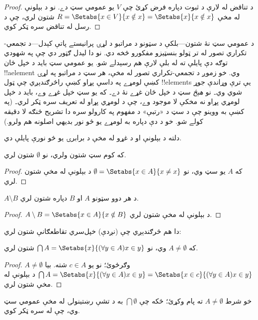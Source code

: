 \documentclass[../../../include/open-logic-section]{subfiles}
\begin{document}
\begin{proof}
د تناقض له لارې د ثبوت دپاره فرض کړئ چې $V$ يو عمومي سټ دے.
نو د بېلونې له مخې $R =
\Setabs{x \in V}{x \notin x} = \Setabs{x}{x \notin x}$ شتون لري،
چې د رسل له تناقض سره ټکر کوي.
\end{proof}

د عمومي سټ نۀ شتون---بلکې د سټونو د مراتبو د لړۍ پرانيستے پاتې
کېدل---د تجمعي-تکراري تصور له تر ټولو بنسټيزو مفکورو څخه دي.
نو دا ليدل ګټور دي چې په شهودي توګه دې پايلې ته له بلې لارې هم
رسېدلے شو. يو عمومي سټ بايد د خپل ځان !!a{element} وي.
خو زموږ د تجمعي-تکراري تصور له مخې، هر سټ د مراتبو په لړۍ کښې
لومړے په داسې پړاو کښې راڅرګندېږي چې ټول !!{element}s يې
ترې وړاندې جوړ شوي وي۔ نو \emph{هېڅ} سټ د خپل ځان غړے نۀ
دے۔ که يو سټ خپل غړے وے، بايد د خپل لومړي پړاو نه مخکې
لا موجود وے، چې د لومړي پړاو له تعريف سره ټکر لري۔
(په  کښې به ووينو چې د سټ
د «رتبې» د مفهوم په کارولو سره دا تشريح څنګه لا دقيقه کولے شو.
خو د دې دپاره به لومړے يو څو نور بديهي اصلونه هم ولرو.)

دلته د بېلونې او د غړو له مخې د برابرۍ يو څو نورې پايلې دي.

\begin{prop}
که کوم سټ شتون ولري، نو $\emptyset$ شتون لري.
\end{prop}

\begin{proof}
که $A$ يو سټ وي، نو $\emptyset = \Setabs{x \in A}{x \neq x}$ د بېلونې له مخې شتون لري.
\end{proof}

\begin{prop}
$A \setminus B$ د هر دوو سټونو $A$ او $B$ دپاره شتون لري.
\end{prop}

\begin{proof}
$A \setminus B = \Setabs{x \in A}{x \notin B}$ د بېلونې له مخې شتون لري.
\end{proof}

دا هم څرګندېږي چې (نږدې) خپل‌سري تقاطعګانې شتون لري:

\begin{prop}
که $A \neq \emptyset$ وي، نو $\bigcap A = \Setabs{x}{(\forall y \in A)x \in y}$ شتون لري.
\end{prop}

\begin{proof}
$A \neq \emptyset$ وګرځوئ؛ نو يو $c \in A$ شته. بيا
$\bigcap A =
\Setabs{x}{(\forall y \in A)x \in y} = \Setabs{x \in c}{(\forall y \in
A)x \in y}$ د بېلونې له مخې شتون لري.
\end{proof}

خو شرط $A \neq \emptyset$ ته پام وکړئ؛ ځکه چې $\bigcap
\emptyset$ به د تشې رښتينولۍ له مخې عمومي سټ وي، چې له
 سره ټکر کوي.
\end{document}
